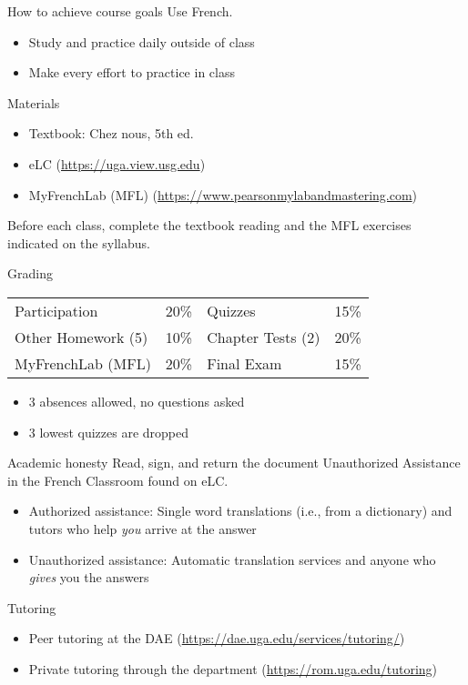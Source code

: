 \documentclass{beamer}
\begin{document}
  \begin{frame}{How to achieve course goals}
    Use French.
    \begin{itemize}
      \item Study and practice \alert{daily} outside of class
      \item Make every effort to practice in class
    \end{itemize}
  \end{frame}

  \begin{frame}{Materials}
    \begin{itemize}
      \item Textbook: Chez nous, 5th ed.
      \item eLC (\url{https://uga.view.usg.edu})
      \item MyFrenchLab (MFL) (\url{https://www.pearsonmylabandmastering.com})
    \end{itemize}
    \alert{Before each class}, complete the textbook reading and the MFL exercises indicated on the syllabus.
  \end{frame}

  \begin{frame}{Grading}
    \begin{center}
      \begin{tabular}{l l | l l}
        Participation      & 20\% & Quizzes           & 15\% \\
        Other Homework (5) & 10\% & Chapter Tests (2) & 20\% \\
        MyFrenchLab (MFL)  & 20\% & Final Exam        & 15\% \\
      \end{tabular}
    \end{center}
    \begin{itemize}
      \item 3 absences allowed, no questions asked
      \item 3 lowest quizzes are dropped
    \end{itemize}
  \end{frame}

  \begin{frame}{Academic honesty}
    Read, sign, and return the document Unauthorized Assistance in the French Classroom found on eLC.
    \begin{itemize}
      \item Authorized assistance: Single word translations (i.e., from a dictionary) and tutors who help \emph{you} arrive at the answer
      \item Unauthorized assistance: Automatic translation services and anyone who \emph{gives} you the answers
    \end{itemize}
  \end{frame}

  \begin{frame}{Tutoring}
    \begin{itemize}
      \item Peer tutoring at the DAE (\url{https://dae.uga.edu/services/tutoring/})
      \item Private tutoring through the department (\url{https://rom.uga.edu/tutoring})
    \end{itemize}
  \end{frame}
\end{document}
